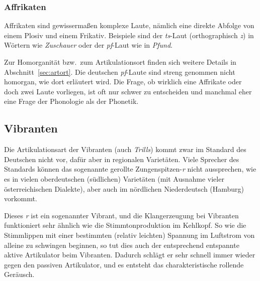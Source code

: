 \subsubsection{Affrikaten}

Affrikaten sind gewissermaßen komplexe Laute, nämlich eine direkte Abfolge von einem Plosiv und einem Frikativ.
Beispiele sind der \textit{ts}-Laut (orthographisch \textit{z}) in Wörtern wie \textit{Zuschauer} oder der \textit{pf}-Laut wie in \textit{Pfund}.


Zur Homorganität bzw.\ zum Artikulationsort finden sich weitere Details in Ab\-schnitt~\ref{sec:artort}.
Die deutschen \textit{pf}-Laute sind \zB streng genommen nicht homorgan, wie dort erläutert wird.
Die Frage, ob wirklich eine Affrikate oder doch zwei Laute vorliegen, ist oft nur schwer zu entscheiden und manchmal eher eine Frage der Phonologie als der Phonetik.

\subsection[Vibranten]{\Opsional Vibranten}

Die Artikulationsart der Vibranten (auch \textit{Trills}) kommt zwar im Standard des Deutschen nicht vor, dafür aber in regionalen Varietäten.
Viele Sprecher des Standards können das sogenannte gerollte Zungenspitzen-\textit{r} nicht aussprechen, wie es in vielen oberdeutschen (südlichen) Varietäten (mit Ausnahme vieler österreichischen Dialekte), aber auch im nördlichen Niederdeutsch (\zB Hamburg) vorkommt.

Dieses \textit{r} ist ein sogenannter Vibrant, und die Klangerzeugung bei Vibranten funktioniert sehr ähnlich wie die Stimmtonproduktion im Kehlkopf.
So wie die Stimmlippen mit einer bestimmten (relativ leichten) Spannung im Luftstrom von alleine zu schwingen beginnen, so tut dies auch der entsprechend entspannte aktive Artikulator beim Vibranten.
Dadurch schlägt er sehr schnell immer wieder gegen den passiven Artikulator, und es entsteht das charakteristische rollende Geräusch.


